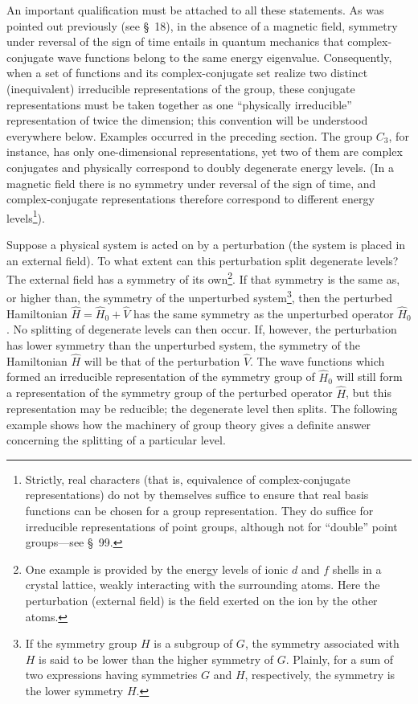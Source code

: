 An important qualification must be attached to all these statements. As was pointed out previously (see \S~18), in the absence of a magnetic field, symmetry under reversal of the sign of time entails in quantum mechanics that complex-conjugate wave functions belong to the same energy eigenvalue. Consequently, when a set of functions and its complex-conjugate set realize two distinct (inequivalent) irreducible representations of the group, these conjugate representations must be taken together as one ``physically irreducible'' representation of twice the dimension; this convention will be understood everywhere below. Examples occurred in the preceding section. The group $C_3$, for instance, has only one-dimensional representations, yet two of them are complex conjugates and physically correspond to doubly degenerate energy levels. (In a magnetic field there is no symmetry under reversal of the sign of time, and complex-conjugate representations therefore correspond to different energy levels\footnote{Strictly, real characters (that is, equivalence of complex-conjugate representations) do not by themselves suffice%
%
to ensure that real basis functions can be chosen for a group representation. They do suffice for irreducible representations of point groups, although not for ``double'' point groups---see \S~99.}).

Suppose a physical system is acted on by a perturbation (the system is placed in an external field). To what extent can this perturbation split degenerate levels? The external field has a symmetry of its own\footnote{One example is provided by the energy levels of ionic $d$ and $f$ shells in a crystal lattice, weakly interacting with the surrounding atoms. Here the perturbation (external field) is the field exerted on the ion by the other atoms.}. If that symmetry is the same as, or higher than, the symmetry of the unperturbed system\footnote{If the symmetry group $H$ is a subgroup of $G$, the symmetry associated with $H$ is said to be lower than the higher symmetry of $G$. Plainly, for a sum of two expressions having symmetries $G$ and $H$, respectively, the symmetry is the lower symmetry $H$.}, then the perturbed Hamiltonian $\widehat H=\widehat H_0+\widehat V$ has the same symmetry as the unperturbed operator $\widehat H_0$. No splitting of degenerate levels can then occur. If, however, the perturbation has lower symmetry than the unperturbed system, the symmetry of the Hamiltonian $\widehat H$ will be that of the perturbation $\widehat V$. The wave functions which formed an irreducible representation of the symmetry group of $\widehat H_0$ will still form a representation of the symmetry group of the perturbed operator $\widehat H$, but this representation may be reducible; the degenerate level then splits. The following example shows how the machinery of group theory gives a definite answer concerning the splitting of a particular level.


